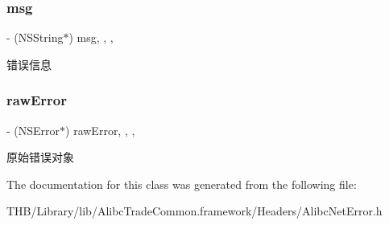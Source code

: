 \subsubsection{\texorpdfstring{msg}{msg}}
{\footnotesize\ttfamily -\/ (N\+S\+String$\ast$) msg\hspace{0.3cm}{\ttfamily [read]}, {\ttfamily [write]}, {\ttfamily [nonatomic]}, {\ttfamily [copy]}}

错误信息 \mbox{\label{interface_alibc_net_error_a49a120db619546fd50f78e9146cab93a}} 
\subsubsection{\texorpdfstring{raw\+Error}{rawError}}
{\footnotesize\ttfamily -\/ (N\+S\+Error$\ast$) raw\+Error\hspace{0.3cm}{\ttfamily [read]}, {\ttfamily [write]}, {\ttfamily [nonatomic]}, {\ttfamily [strong]}}

原始错误对象 

The documentation for this class was generated from the following file\+:\begin{DoxyCompactItemize}
\item 
T\+H\+B/\+Library/lib/\+Alibc\+Trade\+Common.\+framework/\+Headers/Alibc\+Net\+Error.\+h\end{DoxyCompactItemize}

